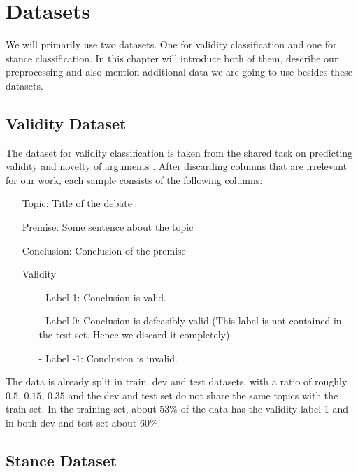 \section{Datasets}

We will primarily use two datasets. One for validity classification and one for stance classification. In this chapter will introduce both of them, describe our preprocessing and also mention additional data we are going to use besides these datasets.

\subsection{Validity Dataset}

The dataset for validity classification is taken from the shared task on predicting validity and novelty of arguments \cite{argsvalidnovel2022}. After discarding columns that are irrelevant for our work, each sample consists of the following columns:
\begin{enumerate}
	\item[\textbullet] Topic: Title of the debate
	\item[\textbullet] Premise: Some sentence about the topic
	\item[\textbullet] Conclusion: Conclusion of the premise
	\item[\textbullet] Validity
	\begin{enumerate}
		\item[-] Label 1: Conclusion is valid.
		\item[-] Label 0: Conclusion is defeasibly valid (This label is not contained in the test set. Hence we discard it completely).
		\item[-] Label -1: Conclusion is invalid.
	\end{enumerate}
\end{enumerate}
The data is already split in train, dev and test datasets, with a ratio of roughly $0.5$, $0.15$, $0.35$ and the dev and test set do not share the same topics with the train set. In the training set, about $53\%$ of the data has the validity label 1 and in both dev and test set about $60\%$.

\subsection{Stance Dataset}

